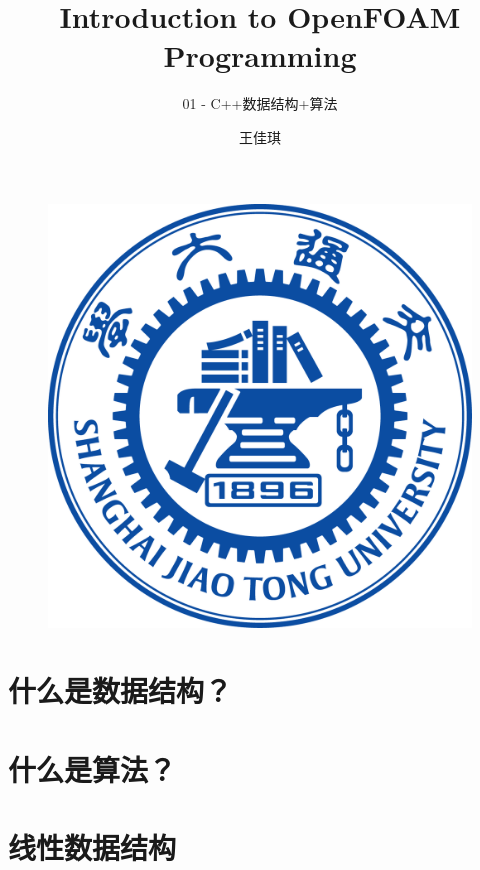 \documentclass{beamer}
\author{{王佳琪}}
\title{Introduction to OpenFOAM Programming}
\subtitle{01 - C++数据结构+算法}
\institute{\kaishu{上海交通大学}}
\date{\kaishu{2022年1月}}
\begin{document}
\songti
\begin{frame}
    \titlepage
    \begin{figure}[htpb]
        \begin{center}
            \includegraphics[width=0.15\linewidth]{pic/WUT.png}
        \end{center}
    \end{figure}
\end{frame}

\begin{frame}
    \tableofcontents[sectionstyle=show,subsectionstyle=show/shaded/hide,subsubsectionstyle=show/shaded/hide]
\end{frame}






\section{什么是数据结构？}








\section{什么是算法？}

% 





\section{线性数据结构}
\end{document}
